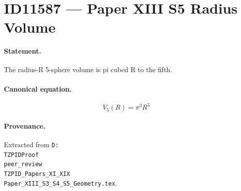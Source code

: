 \section*{ID11587 --- Paper XIII S5 Radius Volume}

\paragraph{Statement.}
The radius-R 5-sphere volume is pi cubed R to the fifth.

\paragraph{Canonical equation.}
\[
V_5(R)=\pi^3R^5
\]

\paragraph{Provenance.}
Extracted from \texttt{D:\\TZPIDProof\\peer\_review\\TZPID\_Papers\_XI\_XIX\\Paper\_XIII\_S3\_S4\_S5\_Geometry.tex}.
